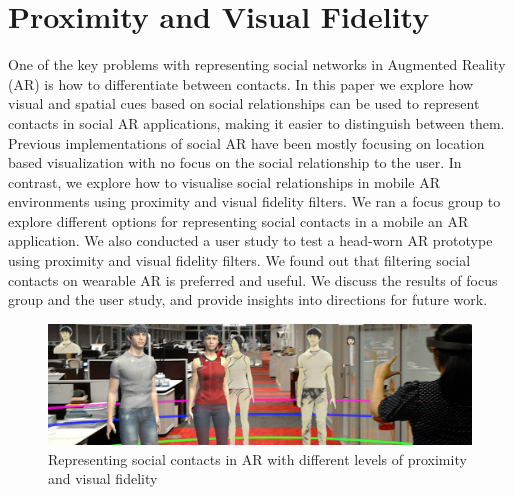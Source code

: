 





\section{Proximity and Visual Fidelity}

One of the key problems with representing social networks in Augmented Reality (AR) is how to differentiate between contacts. In this paper we explore how visual and spatial cues based on social relationships can be used to represent contacts in social AR applications, making it easier to distinguish between them. Previous implementations of social AR have been mostly focusing on location based visualization with no focus on the social relationship to the user. In contrast, we explore how to visualise social relationships in mobile AR environments using proximity and visual fidelity filters. We ran a focus group to explore different options for representing social contacts in a mobile an AR application. We also conducted a user study to test a head-worn AR prototype using proximity and visual fidelity filters. We found out that filtering social contacts on wearable AR is preferred and useful.  We discuss the results of focus group and the user study, and provide insights into directions for future work.


\begin{figure}[ht]
  \includegraphics[width=\textwidth]{images/20170618_031128_HoloLens_cropped}
  \caption{Representing social contacts in AR with different levels of proximity and visual fidelity}
  \label{fig:contacts:overview}
\end{figure}



